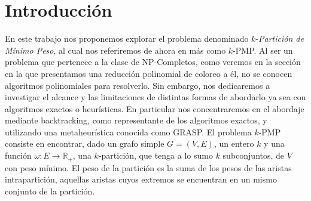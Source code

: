 
\section*{Introducción}

En este trabajo nos proponemos explorar el problema denominado $k$-\textit{Partición de Mínimo Peso}, al
cual nos referiremos de ahora en más como $k$-PMP. Al ser un problema que pertenece a la clase
de NP-Completos, como veremos en la sección en la que presentamos una reducción polinomial de 
coloreo a él, no se conocen algoritmos polinomiales para resolverlo. Sin embargo, nos dedicaremos
a investigar el alcance y las limitaciones de distintas formas de abordarlo ya sea con algoritmos
exactos o heurísticas. En particular nos concentraremos en el abordaje mediante backtracking, 
como representante de los algoritmos exactos, y utilizando una metaheurística conocida como GRASP.
El problema $k$-PMP consiste en encontrar, dado un grafo simple $G = (V, E)$, un entero $k$ y una
función $\omega : E \rightarrow \mathbb{R}_+$, una $k$-partición, que tenga a lo sumo $k$ subconjuntos,
de $V$ con peso mínimo. El peso de la partición es la suma de los pesos de las aristas intrapartición,
aquellas aristas cuyos extremos se encuentran en un mismo conjunto de la partición.
\newpage
